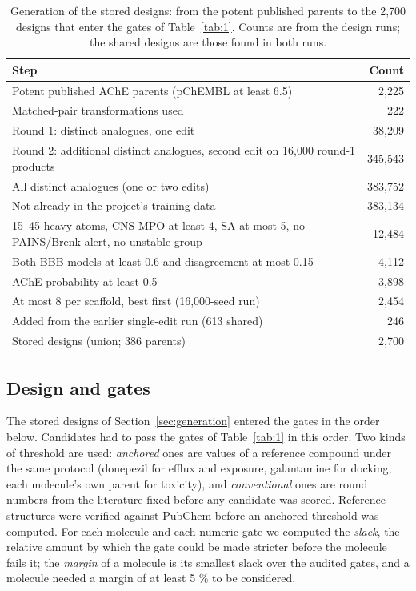 \documentclass[11pt,a4paper]{article}
\begin{document}
\begin{table}[htb]
\centering\small
\caption{Generation of the stored designs: from the potent published parents to the 2,700 designs that enter the gates of Table~\ref{tab:1}. Counts are from the design runs; the shared designs are those found in both runs.}
\label{tab:gen}
\begin{tabular}{p{}r}
\toprule
Step & Count \\
\midrule
Potent published AChE parents (pChEMBL at least 6.5) & 2,225 \\
Matched-pair transformations used & 222 \\
Round 1: distinct analogues, one edit & 38,209 \\
Round 2: additional distinct analogues, second edit on 16,000 round-1 products & 345,543 \\
All distinct analogues (one or two edits) & 383,752 \\
Not already in the project's training data & 383,134 \\
15--45 heavy atoms, CNS MPO at least 4, SA at most 5, no PAINS/Brenk alert, no unstable group & 12,484 \\
Both BBB models at least 0.6 and disagreement at most 0.15 & 4,112 \\
AChE probability at least 0.5 & 3,898 \\
At most 8 per scaffold, best first (16,000-seed run) & 2,454 \\
Added from the earlier single-edit run (613 shared) & 246 \\
Stored designs (union; 386 parents) & 2,700 \\
\bottomrule
\end{tabular}
\end{table}

\subsection{Design and gates}
\label{sec:2.2}

The stored designs of Section~\ref{sec:generation} entered the gates in the order below. Candidates had to pass the gates of Table~\ref{tab:1} in this order. Two kinds of threshold are used: \textit{anchored} ones are values of a reference compound under the same protocol (donepezil for efflux and exposure, galantamine for docking, each molecule's own parent for toxicity), and \textit{conventional} ones are round numbers from the literature fixed before any candidate was scored. Reference structures were verified against PubChem before an anchored threshold was computed. For each molecule and each numeric gate we computed the \textit{slack}, the relative amount by which the gate could be made stricter before the molecule fails it; the \textit{margin} of a molecule is its smallest slack over the audited gates, and a molecule needed a margin of at least 5 \% to be considered.
\end{document}
